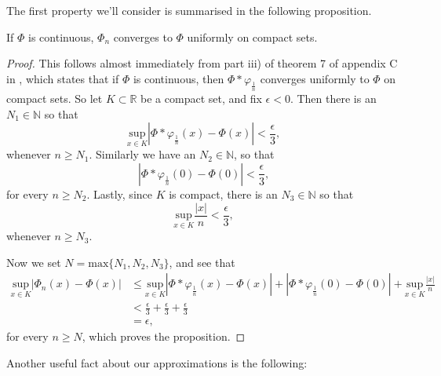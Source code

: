 \documentclass[11pt, a4paper]{article}
\begin{document}
\begin{appendix}
The first property we'll consider is summarised in the following proposition.
\begin{proposition}
\label{prop:Phi_uniform_convergence}
If $\Phi$ is continuous, $\Phi_n$ converges to $\Phi$ uniformly on compact sets.
\end{proposition}
\begin{proof}
This follows almost immediately from part iii) of theorem 7 of appendix C in \citep{evans}, which states that if $\Phi$ is continuous, then $\Phi * \varphi_{\frac{1}{n}}$ converges uniformly to $\Phi$ on compact sets. So let $K\subset \mathbb{R}$ be a compact set, and fix $\epsilon < 0$. Then there is an $N_1 \in \mathbb{N}$ so that
\begin{equation*}
\underset{x\in K}{\mathrm{sup}}|\Phi * \varphi_{\frac{1}{n}}(x) - \Phi(x)| < \frac{\epsilon}{3},
\end{equation*} 
whenever $n \geq N_1$. Similarly we have an $N_2 \in \mathbb{N}$, so that 
\begin{equation*}
|\Phi * \varphi_{\frac{1}{n}}(0) - \Phi(0)| < \frac{\epsilon}{3},
\end{equation*}
for every $n \geq N_2$. Lastly, since $K$ is compact, there is an $N_3 \in \mathbb{N}$ so that
\begin{equation*}
\underset{x\in K}{\mathrm{sup}}\frac{|x|}{n} < \frac{\epsilon}{3},
\end{equation*}
whenever $n \geq N_3$.

Now we set $N = \mathrm{max}\{N_1,N_2,N_3\}$, and see that
\begin{align*}
\underset{x\in K}{\mathrm{sup}}|\Phi_n(x) - \Phi(x)| &\leq  \underset{x\in K}{\mathrm{sup}}|\Phi * \varphi_{\frac{1}{n}}(x) - \Phi(x)| + |\Phi * \varphi_{\frac{1}{n}}(0) - \Phi(0)| + \underset{x\in K}{\mathrm{sup}}\frac{|x|}{n} \\
&< \frac{\epsilon}{3} + \frac{\epsilon}{3} + \frac{\epsilon}{3} \\
&= \epsilon,
\end{align*}
for every $n \geq N$, which proves the proposition.
\end{proof}

Another useful fact about our approximations is the following:


\end{appendix}
\end{document}
